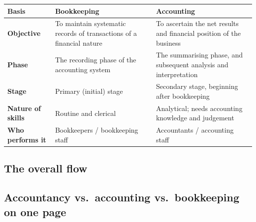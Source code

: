 \documentclass[11pt,a4paper]{article}
\begin{document}
\begin{center}
\small
\begin{tabularx}{\textwidth}{@{}l Y Y@{}}
\toprule
{}\textbf{Basis} & \textbf{Bookkeeping} & \textbf{Accounting}\\
\midrule
\textbf{Objective} & To maintain systematic records of transactions of a financial nature & To ascertain the net results and financial position of the business\\
\textbf{Phase} & The recording phase of the accounting system & The summarising phase, and subsequent analysis and interpretation\\
\textbf{Stage} & Primary (initial) stage & Secondary stage, beginning after bookkeeping\\
\textbf{Nature of skills} & Routine and clerical & Analytical; needs accounting knowledge and judgement\\
\textbf{Who performs it} & Bookkeepers / bookkeeping staff & Accountants / accounting staff\\
\bottomrule
\end{tabularx}
\end{center}

\subsection{The overall flow}

\begin{center}
\end{center}

\subsection{Accountancy vs.\ accounting vs.\ bookkeeping on one page}
\end{document}
